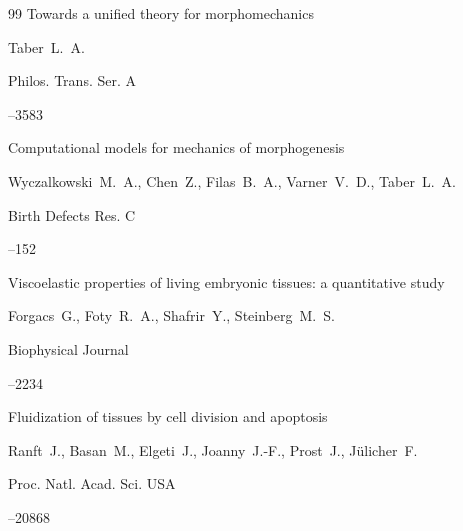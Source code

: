 \begin{thebibliography}{99}
\paper Towards a unified theory for morphomechanics

\by   Taber~L.~A.

\jour   Philos. Trans. Ser. A




--3583


 


\paper Computational models for mechanics of morphogenesis

\by   Wyczalkowski~M.~A., Chen~Z., Filas~B.~A.,  Varner~V.~D., Taber~L.~A.

\jour   Birth Defects Res. C




--152 


 


\paper Viscoelastic properties of living embryonic tissues: a quantitative study

\by   Forgacs~G., Foty~R.~A., Shafrir~Y.,  Steinberg~M.~S.

\jour Biophysical  Journal




--2234





\paper Fluidization of tissues by cell division and apoptosis

\by    Ranft~J., Basan~M.,  Elgeti~J., Joanny~J.-F., Prost~J., J\"ulicher~F.

\jour    Proc. Natl. Acad. Sci. USA




--20868



\end{thebibliography}
